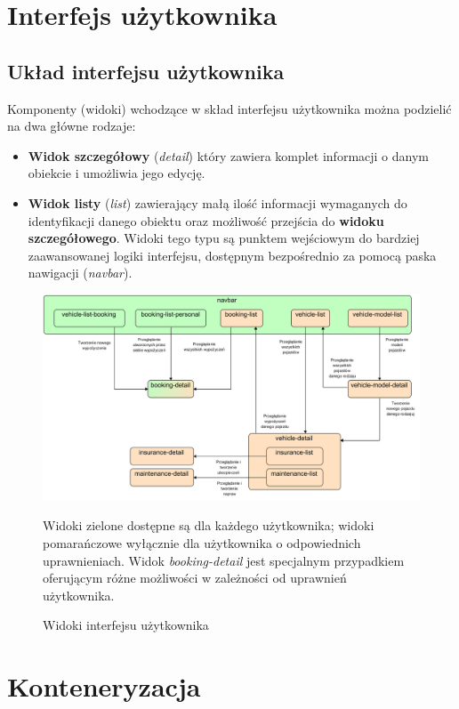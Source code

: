 \documentclass[eng,printmode,openany]{mgr}
\begin{document}
	\section{Interfejs użytkownika}
	\subsection{Układ interfejsu użytkownika}
	Komponenty (widoki) wchodzące w skład interfejsu użytkownika można podzielić na dwa główne rodzaje:
	\begin{itemize}
		\item \textbf{Widok szczegółowy} (\textit{detail}) który zawiera komplet informacji o danym obiekcie i umożliwia jego edycję.
		\item \textbf{Widok listy} (\textit{list}) zawierający małą ilość informacji wymaganych do identyfikacji danego obiektu oraz możliwość przejścia do \textbf{widoku szczegółowego}. Widoki tego typu są punktem wejściowym do bardziej zaawansowanej logiki interfejsu, dostępnym bezpośrednio za pomocą paska nawigacji (\textit{navbar}).
	\end{itemize}
	\begin{figure}[h]
		\centering
		\includegraphics[scale=0.62]{images/angular_views.png}
		\caption{Widoki interfejsu użytkownika}
		\small 
		Widoki zielone dostępne są dla każdego użytkownika; widoki pomarańczowe wyłącznie dla użytkownika o odpowiednich uprawnieniach. Widok \textit{booking-detail} jest specjalnym przypadkiem oferującym różne możliwości w zależności od uprawnień użytkownika.
	\end{figure}
	
	
	
	\section{Konteneryzacja}
	
\end{document}
